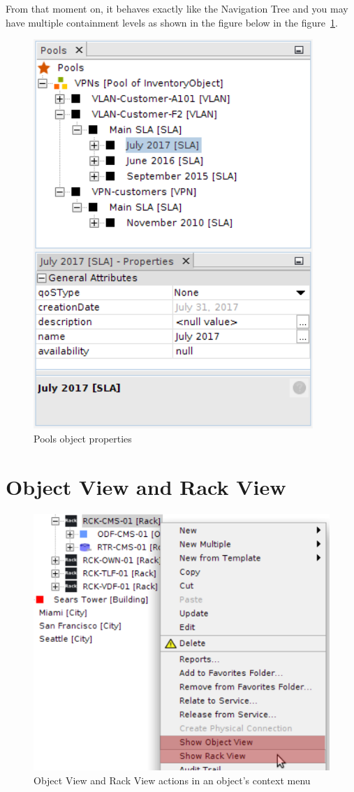 \documentclass[a4paper]{article}
\begin{document}
	\newpage
	From that moment on, it behaves exactly like the Navigation Tree and you may have multiple containment levels as shown in the figure below in the figure~\ref{fig:pools_pool_object_properties}.	
	\begin{figure}[h!]
		\centering
		\includegraphics[width=0.3\linewidth]{img/pools_pool_object_properties.png}
		\caption{Pools object properties}
		\label{fig:pools_pool_object_properties}
	\end{figure}
				
	\clearpage
	\section{Object View and Rack View} \label{sec:object_view_and_rack_view}
	\begin{figure}[h!]
		\centering
		\includegraphics[width=0.6\linewidth]{img/actions_object_and_rack_views.png}
		\caption{Object View and Rack View actions in an object's context menu}
		\label{fig:actions_object_and_rack_views}
	\end{figure}
\end{document}
